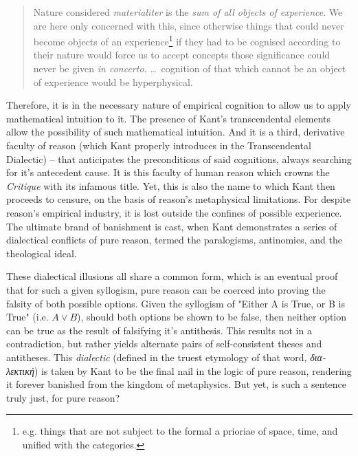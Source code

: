\begin{quote}
  Nature considered \emph{materialiter} is the \emph{sum of all objects of experience}. We are here only concerned with this, since otherwise things that could never become objects of an experience\footnote{e.g. things that are not subject to the formal a prioriae of space, time, and unified with the categories.} if they had to be cognised according to their nature would force us to accept concepts those significance could never be given \emph{in concerto}. \ldots\ cognition of that which cannot be an object of experience would be hyperphysical.

  \autocite[4:296]{prolegomena}
\end{quote}

\noindent
Therefore, it is in the necessary nature of empirical cognition to allow us to apply mathematical intuition to it. The presence of Kant's transcendental elements allow the possibility of such mathematical intuition. And it is a third, derivative faculty of reason (which Kant properly introduces in the Transcendental Dialectic) -- that anticipates the preconditions of said cognitions, always searching for it's antecedent cause. It is this faculty of human reason which crowns the \emph{Critique} with its infamous title. Yet, this is also the name to which Kant then proceeds to censure, on the basis of reason's metaphysical limitations. For despite reason's empirical industry, it is lost outside the confines of possible experience. The ultimate brand of banishment is cast, when Kant demonstrates a series of dialectical conflicts of pure reason, termed the paralogisms, antinomies, and the theological ideal.

These dialectical illusions all share a common form, which is an eventual proof that for such a given syllogism, pure reason can be coerced into proving the falsity of both possible options. Given the syllogism of "Either A is True, or B is True" (i.e. $A \lor B$), should both options be shown to be false, then neither option can be true as the result of falsifying it's antithesis. This results not in a contradiction, but rather yields alternate pairs of self-consistent theses and antitheses. This \emph{dialectic} (defined in the truest etymology of that word, \emph{δια-λεκτική}) is taken by Kant to be the final nail in the logic of pure reason, rendering it forever banished from the kingdom of metaphysics. But yet, is such a sentence truly just, for pure reason?

